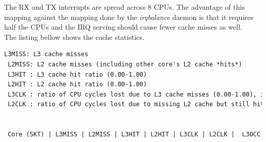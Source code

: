 \noindent
The RX and TX interrupts are spread across 8 CPUs.
The advantage of this mapping against the mapping done by the {\it{irqbalance}} daemon
is that it requires half the CPUs and the IRQ serving should cause fewer cache misses as well.
\\
The listing bellow shows the cache statistics.
\begin{lstlisting}[language=TeX]
 L3MISS: L3 cache misses 
 L2MISS: L2 cache misses (including other core's L2 cache *hits*) 
 L3HIT : L3 cache hit ratio (0.00-1.00)
 L2HIT : L2 cache hit ratio (0.00-1.00)
 L3CLK : ratio of CPU cycles lost due to L3 cache misses (0.00-1.00), in some cases could be >1.0 due to a higher memory latency
 L2CLK : ratio of CPU cycles lost due to missing L2 cache but still hitting L3 cache (0.00-1.00)


 Core (SKT) | L3MISS | L2MISS | L3HIT | L2HIT | L3CLK | L2CLK |  L3OCC


\end{lstlisting}
